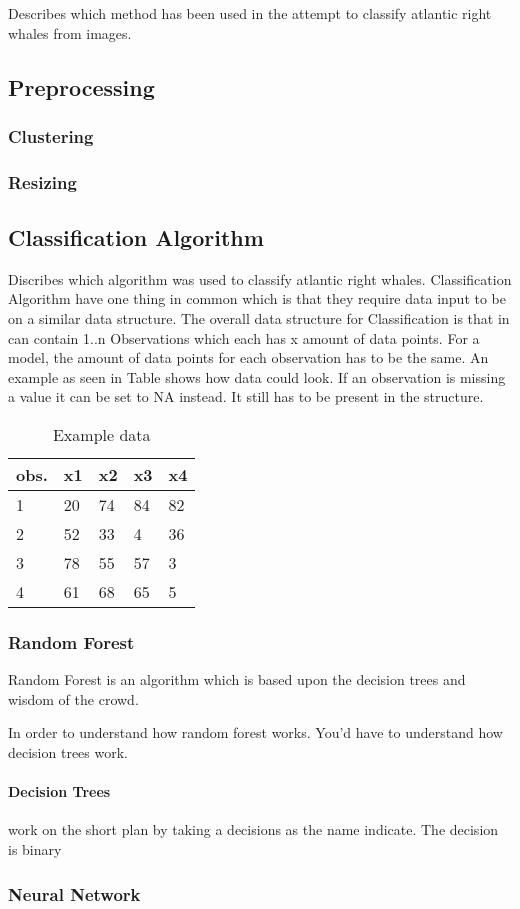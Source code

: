 Describes which method has been used in the attempt to classify atlantic right whales from images.

\subsection{Preprocessing}

\subsubsection{Clustering}

\subsubsection{Resizing}

\subsection{Classification Algorithm}
Discribes which algorithm was used to classify atlantic right whales. Classification Algorithm have one thing in common which is that they require data input to be on a similar data structure.
The overall data structure for Classification is that in can contain 1..n Observations which each has x amount of data points. For a model, the amount of data points for each observation has to be the same. An example as seen in Table  shows how data could look.
If an observation is missing a value it can be set to NA instead. It still has to be present in the structure.

\begin{table}
  \centering
  \caption{Example data}
  \label{tab:example data}
  \begin{tabularx}{\linewidth}{|l|X|X|X|X|} \hline
    obs. & x1 & x2 & x3 & x4 \\ \hline
    1    & 20 & 74 & 84 & 82 \\ \hline
    2    & 52 & 33 & 4  & 36 \\ \hline
    3    & 78 & 55 & 57 & 3  \\ \hline
    4    & 61 & 68 & 65 & 5  \\ \hline
  \end{tabularx}
\end{table}

\subsubsection{Random Forest}
Random Forest is an algorithm which is based upon the decision trees and wisdom of the crowd.

In order to understand how random forest works. You'd have to understand how decision trees work.
\paragraph{Decision Trees} work on the short plan by taking a decisions as the name indicate. The decision is binary

\subsubsection{Neural Network}
